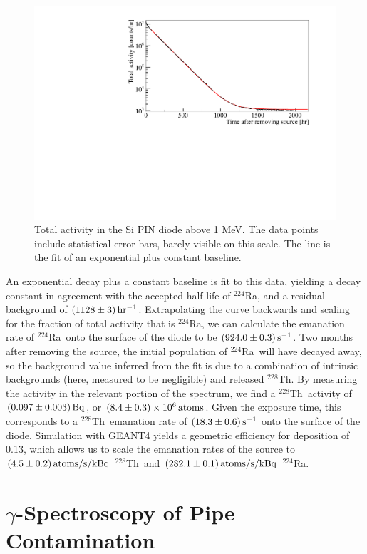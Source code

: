 \begin{figure}[htb]
\centering
    \includegraphics[trim = 5 5 55 20, clip = true,width = 0.8\columnwidth]{figures/rnsource/opensourceactivity}
    \caption{Total activity in the Si PIN diode above 1 MeV. The data points include statistical error bars, barely visible on this scale. The line is the fit of an exponential plus constant baseline.}\label{fig:pindiodespectrum}
\end{figure}

An exponential decay plus a constant baseline is fit to this data, yielding a decay constant in agreement with the accepted half-life of $^{224}$Ra, and a residual background of $(1128\pm3)\,\mathrm{hr^{-1}}$. Extrapolating the curve backwards and scaling for the fraction of total activity that is $^{224}$Ra, we can calculate the emanation rate of $^{224}$Ra~onto the surface of the diode to be $(924.0\pm0.3)\,\mathrm{s^{-1}}$. Two months after removing the source, the initial population of $^{224}$Ra~will have decayed away, so the background value inferred from the fit is due to a combination of intrinsic backgrounds (here, measured to be negligible) and released $^{228}$Th. By measuring the activity in the relevant portion of the spectrum, we find a $^{228}$Th~activity of $(0.097\pm0.003)\,\mathrm{Bq}$, or $(8.4\pm0.3)\times10^6\,\mathrm{atoms}$. Given the exposure time, this corresponds to a $^{228}$Th~emanation rate of $(18.3\pm0.6)\,\mathrm{s^{-1}}$ onto the surface of the diode. Simulation with GEANT4 yields a geometric efficiency for deposition of 0.13, which allows us to scale the emanation rates of the source to $(4.5\pm0.2)\,\mathrm{atoms/s/kBq}$ $^{228}$Th~and $(282.1\pm0.1)\,\mathrm{atoms/s/kBq}$ $^{224}$Ra.

\section{$\gamma$-Spectroscopy of Pipe Contamination}
\label{sec:flush}

